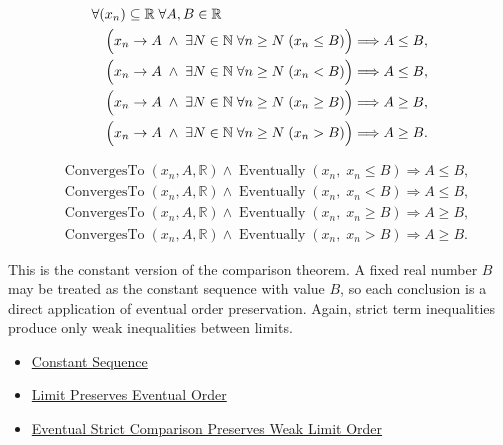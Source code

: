 \begin{remark*}
\[
\begin{aligned}
&\forall (x_n)\subseteq\mathbb{R}\;\forall A,B\in\mathbb{R}\\
&\quad\Bigl(
  x_n\to A
  \;\land\;
  \exists N\in\mathbb{N}\;\forall n\ge N\;(x_n\le B)
\Bigr)
\Longrightarrow A\le B,\\
&\quad\Bigl(
  x_n\to A
  \;\land\;
  \exists N\in\mathbb{N}\;\forall n\ge N\;(x_n<B)
\Bigr)
\Longrightarrow A\le B,\\
&\quad\Bigl(
  x_n\to A
  \;\land\;
  \exists N\in\mathbb{N}\;\forall n\ge N\;(x_n\ge B)
\Bigr)
\Longrightarrow A\ge B,\\
&\quad\Bigl(
  x_n\to A
  \;\land\;
  \exists N\in\mathbb{N}\;\forall n\ge N\;(x_n>B)
\Bigr)
\Longrightarrow A\ge B.
\end{aligned}
\]
\end{remark*}

\begin{remark*}
\[
\begin{aligned}
&\operatorname{ConvergesTo}(x_n,A,\mathbb{R})
\land
\operatorname{Eventually}(x_n,\;x_n\le B)
\Longrightarrow A\le B,\\
&\operatorname{ConvergesTo}(x_n,A,\mathbb{R})
\land
\operatorname{Eventually}(x_n,\;x_n<B)
\Longrightarrow A\le B,\\
&\operatorname{ConvergesTo}(x_n,A,\mathbb{R})
\land
\operatorname{Eventually}(x_n,\;x_n\ge B)
\Longrightarrow A\ge B,\\
&\operatorname{ConvergesTo}(x_n,A,\mathbb{R})
\land
\operatorname{Eventually}(x_n,\;x_n>B)
\Longrightarrow A\ge B.
\end{aligned}
\]
\end{remark*}

\begin{remark*}[Interpretation]
This is the constant version of the comparison theorem. A fixed real number
$B$ may be treated as the constant sequence with value $B$, so each conclusion
is a direct application of eventual order preservation. Again, strict term
inequalities produce only weak inequalities between limits.
\end{remark*}

\begin{dependencies}
\begin{itemize}
  \item \hyperref[def:constant-sequence]{Constant Sequence}
  \item \hyperref[thm:limit-preserves-eventual-order]{Limit Preserves Eventual Order}
  \item \hyperref[thm:eventual-strict-comparison-preserves-weak-limit-order]{Eventual Strict Comparison Preserves Weak Limit Order}
\end{itemize}
\end{dependencies}


